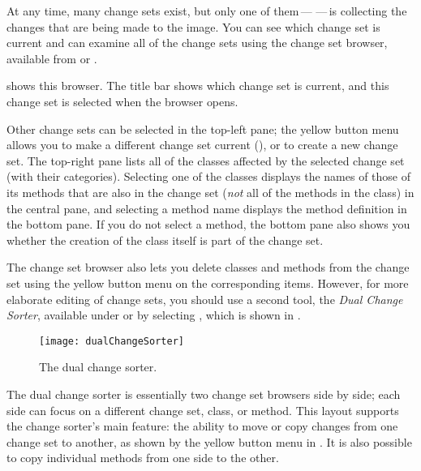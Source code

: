\documentclass[a4paper,10pt,twoside]{book}
\begin{document}
At any time, many change sets exist, but only one of them\,---\,\,---\,is collecting the changes that are being made to the image.
You can see which change set is current and can examine all of the change sets using the  change set browser, available from  or .

 shows this browser.
The title bar shows which change set is current, and this change set is selected when the browser opens.

Other change sets can be selected in the top-left pane; the yellow button menu allows you to make a different change set current (), or to create a new change set.
The top-right pane lists all of the classes affected by the selected change set (with their categories).
Selecting one of the classes displays the names of those of its methods that are also in the change set (\emph{not} all of the methods in the class) in the central pane, and selecting a method name displays the method definition in the bottom pane.
If you do not select a method, the bottom pane also shows you whether the creation of the class itself is part of the change set.

The change set browser also lets you delete classes and methods from the change set using the yellow button menu on the corresponding items.
However, for more elaborate editing of change sets, you should use a second tool, the \textit{Dual Change Sorter}, available under  or by selecting , which is shown in .

\begin{figure}[btp]
	\begin{center}
		\texttt{[image: dualChangeSorter]}
	\end{center}
	\caption{The dual change sorter.}
	\label{fig:dualChangeSorter}
\end{figure}

The dual change sorter is essentially two change set browsers side by side; each side can focus on a different change set, class, or method.
This layout supports the change sorter's main feature: the ability to move or copy changes from one change set to another, as shown by the yellow button menu in .
It is also possible to copy individual methods from one side to the other.
\end{document}
